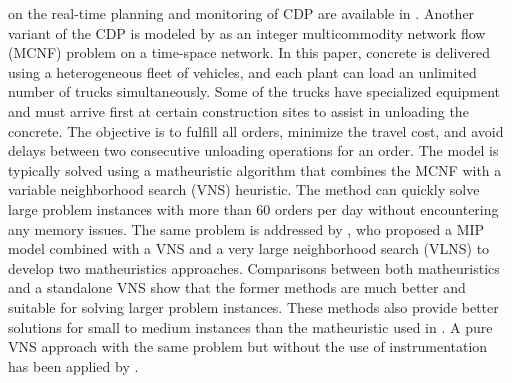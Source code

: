 \documentclass{article}
\begin{document}
on the real-time planning and monitoring of CDP are available in \cite{garza2021dynamic}. Another variant of the CDP is modeled by \cite{schmid2009hybrid} as an integer multicommodity network flow (MCNF) problem on a time-space network. In this paper, concrete is delivered using a heterogeneous fleet of vehicles, and each plant can load an unlimited number of trucks simultaneously. Some of the trucks have specialized equipment and must arrive first at certain construction sites to assist in unloading the concrete. The objective is to fulfill all orders, minimize the travel cost, and avoid delays between two consecutive unloading operations for an order. The model is typically solved using a matheuristic algorithm that combines the MCNF with a variable neighborhood search (VNS) heuristic. The method can quickly solve large problem instances with more than 60 orders per day without encountering any memory issues. The same problem is addressed by \cite{schmid2010hybridization}, who proposed a MIP model combined with a VNS and a very large neighborhood search (VLNS) to develop two matheuristics approaches. Comparisons between both matheuristics and a standalone VNS show that the former methods are much better and suitable for solving larger problem instances. These methods also provide better solutions for small to medium instances than the matheuristic used in \cite{schmid2009hybrid}. A pure VNS approach with the same problem but without the use of instrumentation has been applied by \cite{payr2009optimizing}.
\end{document}
